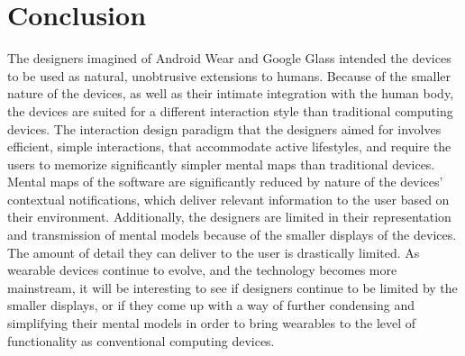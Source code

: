 \documentclass[12pt]{article}
\begin{document}
\section{Conclusion}
The designers imagined of Android Wear and Google Glass intended the devices to be used as natural, unobtrusive extensions to humans. Because of the smaller nature of the devices, as well as their intimate integration with the human body, the devices are suited for a different interaction style than traditional computing devices. The interaction design paradigm that the designers aimed for involves efficient, simple interactions, that accommodate active lifestyles, and require the users to memorize significantly simpler mental maps than traditional devices. Mental maps of the software are significantly reduced by nature of the devices' contextual notifications, which deliver relevant information to the user based on their environment. Additionally, the designers are limited in their representation and transmission of mental models because of the smaller displays of the devices. The amount of detail they can deliver to the user is drastically limited. As wearable devices continue to evolve, and the technology becomes more mainstream, it will be interesting to see if designers continue to be limited by the smaller displays, or if they come up with a way of further condensing and simplifying their mental models in order to bring wearables to the level of functionality as conventional computing devices.



\end{document}
